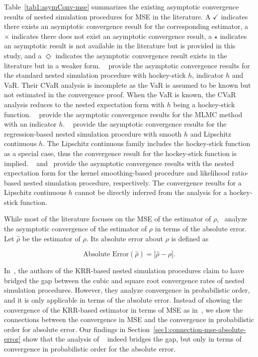 Table~\ref{tab1:asymConv-mse} summarizes the existing asymptotic convergence results of nested simulation procedures for MSE in the literature.
A $\checkmark$ indicates there exists an asymptotic convergence result for the corresponding estimator,
a $\times$ indicates there does not exist an asymptotic convergence result, 
a $\star$ indicates an asymptotic result is not available in the literature but is provided in this study, and
a $\Diamond$ indicates the asymptotic convergence result exists in the literature but in a weaker form.
~\cite{gordy2010nested} provide the asymptotic convergence results for the standard nested simulation procedure with hockey-stick $h$, indicator $h$ and VaR.
Their CVaR analysis is incomplete as the VaR is assumed to be known but not estimated in the convergence proof.
When the VaR is known, the CVaR analysis reduces to the nested expectation form with $h$ being a hockey-stick function.
~\cite{giles2019multilevel} provide the asymptotic convergence results for the MLMC method with an indicator $h$.
~\cite{broadie2015risk} provide the asymptotic convergence results for the regression-based nested simulation procedure with smooth $h$ and Lipschitz continuous $h$.
The Lipschitz continuous family includes the hockey-stick function as a special case, thus the convergence result for the hockey-stick function is implied.
~\cite{hong2017kernel} and~\cite{zhang2022sample} provide the asymptotic convergence results with the nested expectation form for the kernel smoothing-based procedure and likelihood ratio-based nested simulation procedure, respectively.
The convergence results for a Lipschitz continuous $h$ cannot be directly inferred from the analysis for a hockey-stick function.

While most of the literature focuses on the MSE of the estimator of $\rho$,~\cite{wang2022smooth} analyze the asymptotic convergence of the estimator of $\rho$ in terms of the absolute error.
Let $\hat{\rho}$ be the estimator of $\rho$. Its absolute error about $\rho$ is defined as

$$
\mbox{Absolute Error}\left(\hat{\rho}\right) = \left| \hat{\rho} - \rho \right|.
$$

In~\cite{wang2022smooth}, the authors of the KRR-based nested simulation procedures claim to have bridged the gap between the cubic and square root convergence rates of nested simulation procedures. However, they analyze convergence in probabilistic order, and it is only applicable in terms of the absolute error. 
Instead of showing the convergence of the KRR-based estimator in terms of MSE as in~\cite{gordy2010nested}, we show the connections between the convergence in MSE and the convergence in probabilistic order for absolute error.
Our findings in Section~\ref{sec1:connection-mse-absolute-error} show that the analysis of ~\cite{wang2022smooth} indeed bridges the gap, but only in terms of convergence in probabilistic order for the absolute error.

